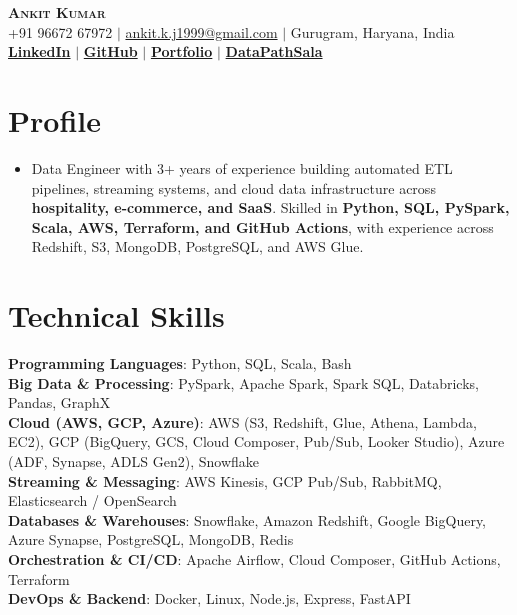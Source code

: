 \documentclass[letterpaper,10pt]{article}
\begin{document}
\begin{center}
    \textbf{\Huge \scshape Ankit Kumar} \\ \vspace{2pt}
    \small +91 96672 67972 $|$ \href{mailto:ankit.k.j1999@gmail.com}{ankit.k.j1999@gmail.com} $|$ Gurugram, Haryana, India \\ \vspace{1pt}
    \small \href{https://www.linkedin.com/in/ankitkj1999/}{\bf LinkedIn} $|$
    \href{https://github.com/ankitkj1999}{\bf GitHub} $|$
    \href{https://ankitkj1999.github.io}{\bf Portfolio} $|$
    \href{https://datapathsala.com/u/Ankit\_Kumar\_1999}{\bf DataPathSala}
\end{center}

\section{Profile}
\begin{itemize}[leftmargin=0.15in, label={}]
\item
Data Engineer with 3+ years of experience building automated ETL pipelines, streaming systems, and cloud data infrastructure across \textbf{hospitality, e-commerce, and SaaS}. Skilled in \textbf{Python, SQL, PySpark, Scala, AWS, Terraform, and GitHub Actions}, with experience across Redshift, S3, MongoDB, PostgreSQL, and AWS Glue.
\end{itemize}

\section{Technical Skills}
\begin{itemize}[leftmargin=0.15in, label={}]
\small{\item{
  \textbf{Programming Languages}{: Python, SQL, Scala, Bash} \\ \vspace{1pt}
  \textbf{Big Data \& Processing}{: PySpark, Apache Spark, Spark SQL, Databricks, Pandas, GraphX} \\ \vspace{1pt}
  \textbf{Cloud (AWS, GCP, Azure)}{: AWS (S3, Redshift, Glue, Athena, Lambda, EC2), GCP (BigQuery, GCS, Cloud Composer, Pub/Sub, Looker Studio), Azure (ADF, Synapse, ADLS Gen2), Snowflake} \\ \vspace{1pt}
  \textbf{Streaming \& Messaging}{: AWS Kinesis, GCP Pub/Sub, RabbitMQ, Elasticsearch / OpenSearch} \\ \vspace{1pt}
  \textbf{Databases \& Warehouses}{: Snowflake, Amazon Redshift, Google BigQuery, Azure Synapse, PostgreSQL, MongoDB, Redis} \\ \vspace{1pt}
  \textbf{Orchestration \& CI/CD}{: Apache Airflow, Cloud Composer, GitHub Actions, Terraform} \\ \vspace{1pt}
  \textbf{DevOps \& Backend}{: Docker, Linux, Node.js, Express, FastAPI}
}}
\end{itemize}
\end{document}

